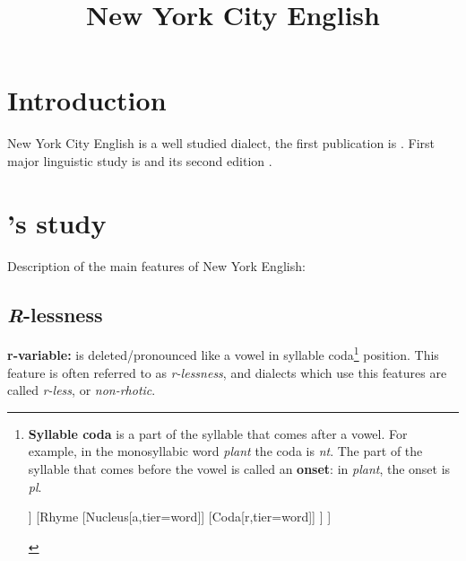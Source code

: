 \documentclass[11pt]{article}
\title{New York City English}%
\renewcommand{\baselinestretch}{1.0}
\newcommand{\1}{$'$}
\newcommand{\2}{$''$}
\newcommand{\3}{$'''$}
\begin{document}


\begin{center}
\LARGE\textbf{\thetitle}
\end{center}


\tableofcontents

\section{Introduction}

New York City English is a well studied dialect, the first publication is \citealp{Babbitt:1896}. First major linguistic study is \citealp{Labov:1966} and its second edition \citealp{Labov:2006}.

\section{\citeauthor{Labov:1966}'s study}

Description of the main features of New York English:

\subsection{\emph{R}-lessness}

	 \textbf{r-variable:} \textipa{[\*r]} is deleted/pronounced like a vowel in syllable coda\footnote{\textbf{Syllable coda} is a part of the syllable that comes after a vowel. For example, in the monosyllabic word \emph{plant} the coda is \emph{nt}. The part of the syllable that comes before the vowel is called an \textbf{onset}: in \emph{plant}, the onset is \emph{pl}.
		
		\begin{center}
			\begin{forest}
				[Syllable, for tree={parent anchor=south, child anchor=north}
					[Onset[c,tier=word]]
					[Rhyme
						[Nucleus[a,tier=word]]
						[Coda[r,tier=word]]	
					]
				]	
			\end{forest}
	
		\end{center}

	} position. This feature is often referred to as \emph{r-lessness}, and dialects which use this features are called \emph{r-less}, or \emph{non-rhotic}.
	
\end{document}
